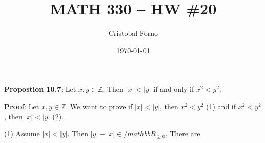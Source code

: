 \documentclass[12pt]{article}
\title{MATH 330 -- HW \#20}
\author{Cristobal Forno}
\date{\today}
\begin{document}
\maketitle

\noindent
\textbf{Propostion 10.7}: Let $x, y \in \mathbb{Z}$. Then $|x| < |y|$ if and
only if $x^2 < y^2$.

\noindent
\textbf{Proof}:
Let $x, y \in \mathbb{Z}$. We want to prove if $|x| < |y|$, then $x^2 < y^2$ (1)
and if $x^2 < y^2$, then $|x| < |y|$ (2).

\indent
(1) Assume $|x| < |y|$. Then $|y| - |x| \in /mathbb{R_{\geq0}}$. There are 
\end{document}
